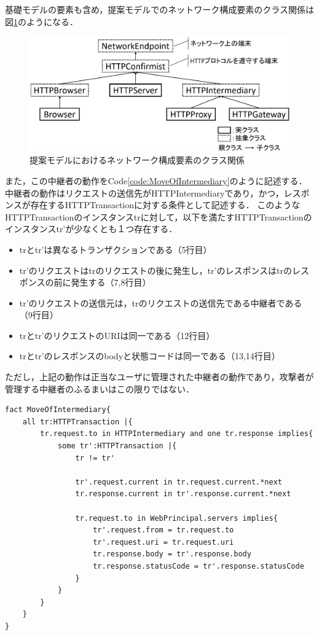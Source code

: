 \documentclass[12pt,a4paper]{jbook}
\begin{document}
基礎モデルの要素も含め，提案モデルでのネットワーク構成要素のクラス関係は図\ref{fig:NetworkComponent}のようになる．

\begin{figure}[htb]
\centering
\includegraphics[width=450pt]{./fig/NetworkComponent.eps}
\caption{提案モデルにおけるネットワーク構成要素のクラス関係}
\label{fig:NetworkComponent}
\end{figure}

また，この中継者の動作をCode\ref{code:MoveOfIntermediary}のように記述する．
中継者の動作はリクエストの送信先がHTTPIntermediaryであり，かつ，レスポンスが存在するHTTPTransactionに対する条件として記述する．
このようなHTTPTransactionのインスタンスtrに対して，以下を満たすHTTPTransactionのインスタンスtr'が少なくとも１つ存在する．
\begin{itemize}
\item trとtr'は異なるトランザクションである（5行目）
\item tr'のリクエストはtrのリクエストの後に発生し，tr'のレスポンスはtrのレスポンスの前に発生する（7,8行目）
\item tr'のリクエストの送信元は，trのリクエストの送信先である中継者である（9行目）
\item trとtr'のリクエストのURIは同一である（12行目）
\item trとtr'のレスポンスのbodyと状態コードは同一である（13,14行目）
\end{itemize}
ただし，上記の動作は正当なユーザに管理された中継者の動作であり，攻撃者が管理する中継者のふるまいはこの限りではない．

\begin{lstlisting}[caption=中継者の動作, label=code:MoveOfIntermediary]
fact MoveOfIntermediary{
	all tr:HTTPTransaction |{
		tr.request.to in HTTPIntermediary and one tr.response implies{
			some tr':HTTPTransaction |{
				tr != tr'				
				
				tr'.request.current in tr.request.current.*next
				tr.response.current in tr'.response.current.*next

				tr.request.to in WebPrincipal.servers implies{
					tr'.request.from = tr.request.to
					tr'.request.uri = tr.request.uri
					tr.response.body = tr'.response.body
					tr.response.statusCode = tr'.response.statusCode
				}
			}
		}
	}
}
\end{lstlisting}

\end{document}
